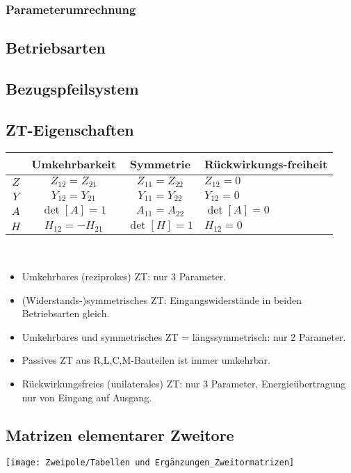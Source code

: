 \subsubsection{Parameterumrechnung}


\subsection{Betriebsarten}

\subsection{Bezugspfeilsystem}

\subsection{ZT-Eigenschaften}
\small
\begin{tabularx}{0.85\columnwidth}{|c|c|c|X|}
	\hline
	& Umkehrbarkeit & Symmetrie & Rückwirkungs-freiheit\\
	\hline\hline
	$Z$&  $Z_{12} = Z_{21}$ & $Z_{11} = Z_{22}$ & $Z_{12} = 0$\\
	\hline
	$Y$&  $Y_{12} = Y_{21}$& $Y_{11} = Y_{22}$ & $Y_{12 } = 0$ \\
	\hline
	$A$&  $\operatorname{det}[A] = 1$& $A_{11} = A_{22}$ & $\operatorname{det}[A] = 0$\\
	\hline
	$H$&  $H_{12} = -H_{21}$& $\operatorname{det}[H]=1$ & $H_{12} = 0$ \\
	\hline
\end{tabularx}\\
\begin{itemize}[leftmargin=*]
	\item Umkehrbares (reziprokes) ZT: nur 3 Parameter.
	\item (Widerstands-)symmetrisches ZT: Eingangswiderstände in beiden Betriebsarten gleich.
	\item Umkehrbares und symmetrisches ZT = längssymmetrisch: nur 2 Parameter.
	\item Passives ZT aus R,L,C,M-Bauteilen ist immer umkehrbar.
	\item Rückwirkungsfreies (unilaterales) ZT: nur 3 Parameter, Energieübertragung nur von Eingang auf Ausgang.
\end{itemize}
\clearpage
\begin{samepage}
    \subsection{Matrizen elementarer Zweitore}
    \begin{center}
    	\texttt{[image: Zweipole/Tabellen und Ergänzungen\_Zweitormatrizen]}
    \end{center}
\end{samepage}
\clearpage


